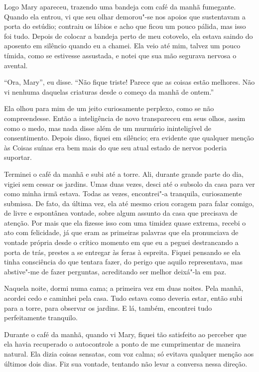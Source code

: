 Logo Mary apareceu, trazendo uma bandeja com café da manhã fumegante. Quando ela entrou, vi que seu olhar demorou"-se
nos apoios que sustentavam a porta do estúdio; contraiu os lábios e acho que ficou um pouco pálida, mas isso foi tudo.
Depois de colocar a bandeja perto de meu cotovelo, ela estava saindo do aposento em silêncio quando eu a chamei. Ela
veio até mim, talvez um pouco tímida, como se estivesse assustada, e notei que sua mão segurava nervosa o avental.

``Ora, Mary'', eu disse. ``Não fique triste! Parece que as coisas estão melhores. Não vi nenhuma daquelas criaturas desde
o começo da manhã de ontem.''

Ela olhou para mim de um jeito curiosamente perplexo, como se não compreendesse. Então a inteligência de novo
transpareceu em seus olhos, assim como o medo, mas nada disse além de um murmúrio ininteligível de consentimento.
Depois disso, fiquei em silêncio; era evidente que qualquer menção às Coisas suínas era bem mais do que seu atual
estado de nervos poderia suportar.

Terminei o café da manhã e subi até a torre. Ali, durante grande parte do dia, vigiei sem cessar os
jardins. Umas duas vezes, desci até o subsolo da casa para ver como minha irmã estava. Todas as vezes, encontrei"-a
tranquila, curiosamente submissa. De fato, da última vez, ela até mesmo criou coragem para falar comigo, de livre e
espontânea vontade, sobre algum assunto da casa que precisava de atenção. Por mais que ela fizesse isso com uma timidez
quase extrema, recebi o ato com felicidade, já que eram as primeiras palavras que ela pronunciava de vontade própria
desde o crítico momento em que eu a peguei destrancando a porta de trás, prestes a se entregar às feras à espreita.
Fiquei pensando se ela tinha consciência do que tentara fazer, do perigo que aquilo representava, mas abstive"-me de
fazer perguntas, acreditando ser melhor deixá"-la em paz.

Naquela noite, dormi numa cama; a primeira vez em duas noites. Pela manhã, acordei cedo e caminhei pela casa. Tudo
estava como deveria estar, então subi para a torre, para observar os jardins. E lá, também, encontrei tudo
perfeitamente tranquilo.

Durante o café da manhã, quando vi Mary, fiquei tão satisfeito ao perceber que ela havia recuperado o
autocontrole a ponto de me cumprimentar de maneira natural. Ela dizia coisas sensatas, com voz calma; só
evitava qualquer menção aos últimos dois dias. Fiz sua vontade, tentando não levar a conversa nessa
direção.

